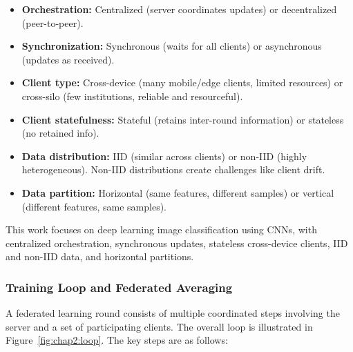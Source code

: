 \documentclass[11pt]{report}
\begin{document}
\begin{itemize}
  \item \textbf{Orchestration:} Centralized (server coordinates updates) or decentralized (peer-to-peer).
  \item \textbf{Synchronization:} Synchronous (waits for all clients) or asynchronous (updates as received).
  \item \textbf{Client type:} Cross-device (many mobile/edge clients, limited resources) or cross-silo (few institutions, reliable and resourceful).
  \item \textbf{Client statefulness:} Stateful (retains inter-round information) or stateless (no retained info).
  \item \textbf{Data distribution:} IID (similar across clients) or non-IID (highly heterogeneous). Non-IID distributions create challenges like client drift.
  \item \textbf{Data partition:} Horizontal (same features, different samples) or vertical (different features, same samples).
\end{itemize}

This work focuses on deep learning image classification using CNNs, with centralized orchestration, synchronous updates, stateless cross-device clients, IID and non-IID data, and horizontal partitions.

\subsubsection{Training Loop and Federated Averaging}

A federated learning round consists of multiple coordinated steps involving the server and a set of participating clients. The overall loop is illustrated in Figure~\ref{fig:chap2:loop}. The key steps are as follows:
\end{document}
